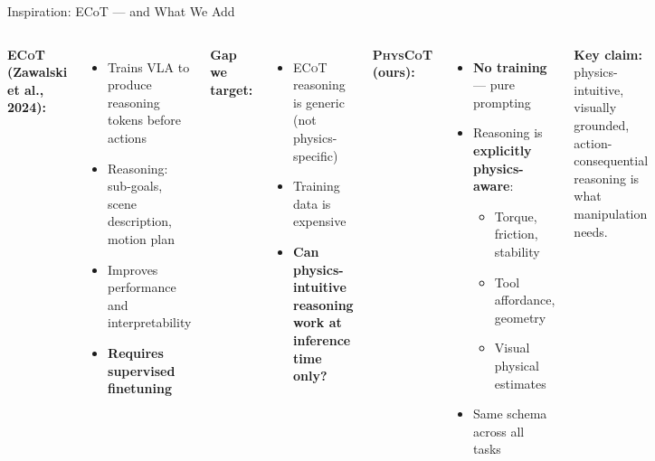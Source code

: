 \documentclass[aspectratio=169,10pt]{beamer}
\newcommand{\physcot}{\textsc{PhysCoT}}
\newcommand{\ecot}{\textsc{ECoT}}
\newcommand{\succ}[1]{\textcolor{physgreen}{\textbf{#1}}}
\begin{document}
\begin{frame}{Inspiration: ECoT — and What We Add}
\begin{columns}[T]
\textbf{\ecot{} (Zawalski et al., 2024):}
\begin{itemize}
  \item Trains VLA to produce reasoning tokens before actions
  \item Reasoning: sub-goals, scene description, motion plan
  \item Improves performance and interpretability
  \item \textbf{Requires supervised finetuning}
\end{itemize}

\vspace{0.3cm}
\textbf{Gap we target:}
\begin{itemize}
  \item \ecot{} reasoning is generic (not physics-specific)
  \item Training data is expensive
  \item \textbf{Can physics-intuitive reasoning work at inference time only?}
\end{itemize}

\textbf{\physcot{} (ours):}
\begin{itemize}
  \item \succ{No training} — pure prompting
  \item Reasoning is \textbf{explicitly physics-aware}:
    \begin{itemize}
      \item Torque, friction, stability
      \item Tool affordance, geometry
      \item Visual physical estimates
    \end{itemize}
  \item Same schema across all tasks
\end{itemize}

\vspace{0.3cm}
\begin{tcolorbox}[colback=physgreen!10,colframe=physgreen,left=3pt,right=3pt,
                  top=2pt,bottom=2pt,boxrule=1pt]
\small
\textbf{Key claim:} physics-intuitive, visually grounded,
action-consequential reasoning is what manipulation needs.
\end{tcolorbox}
\end{columns}
\end{frame}
\end{document}
